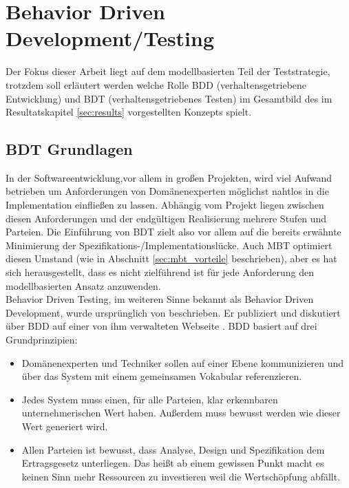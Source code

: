 \section{Behavior Driven Development/Testing}
\label{sec:bdd}

Der Fokus dieser Arbeit liegt auf dem modellbasierten Teil der Teststrategie, trotzdem soll erläutert werden welche Rolle \Gls{BDD} (verhaltensgetriebene Entwicklung) und \Gls{BDT} (verhaltensgetriebenes Testen) im Gesamtbild des im Resultatskapitel \ref{sec:results} vorgestellten Konzepts spielt.

\subsection{BDT Grundlagen}
In der Softwareentwicklung,vor allem in großen Projekten, wird viel Aufwand betrieben um Anforderungen von Domänenexperten möglichst nahtlos in die Implementation einfließen zu lassen. Abhängig vom Projekt liegen zwischen diesen Anforderungen und der endgültigen Realisierung mehrere Stufen und Parteien. Die Einführung von \Gls{BDT} zielt also vor allem auf die bereits erwähnte Minimierung der Spezifikations-/Implementationslücke. Auch \Gls{MBT} optimiert diesen Umstand (wie in Abschnitt \ref{sec:mbt_vorteile} beschrieben), aber es hat sich herausgestellt, dass es nicht zielführend ist für jede Anforderung den modellbasierten Ansatz anzuwenden.\\
Behavior Driven Testing, im weiteren Sinne bekannt als Behavior Driven Development, wurde ursprünglich von \citeauthor{north_official_2015} beschrieben. Er publiziert und diskutiert über \gls{BDD} auf einer von ihm verwalteten Webseite \cite{north_official_2015}. \gls{BDD} basiert auf drei Grundprinzipien:

\begin{itemize}
\item Domänenexperten und Techniker sollen auf einer Ebene kommunizieren und über das System mit einem gemeinsamen Vokabular referenzieren.
\item Jedes System muss einen, für alle Parteien, klar erkennbaren unternehmerischen Wert haben. Außerdem muss bewusst werden wie dieser Wert generiert wird.
\item Allen Parteien ist bewusst, dass Analyse, Design und Spezifikation dem Ertragsgesetz unterliegen. Das heißt ab einem gewissen Punkt macht es keinen Sinn mehr Ressourcen zu investieren weil die Wertschöpfung abfällt.
\end{itemize}

